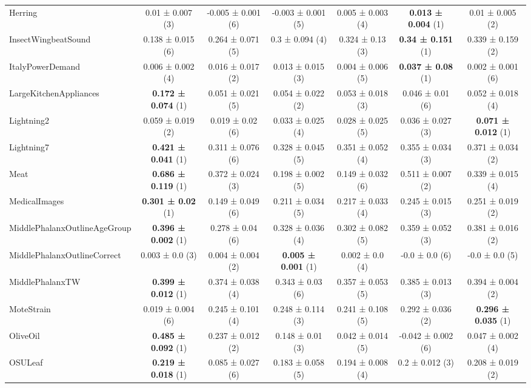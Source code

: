 \begin{table}[ht]
\begin{adjustbox}{width=\textwidth}
\begin{tabular}{lcccccc}
    Herring & 0.01 ± 0.007 (3) & -0.005 ± 0.001 (6) & -0.003 ± 0.001 (5) & 0.005 ± 0.003 (4) & \textbf{0.013 ± 0.004} (1) & 0.01 ± 0.005 (2) \\
    InsectWingbeatSound & 0.138 ± 0.015 (6) & 0.264 ± 0.071 (5) & 0.3 ± 0.094 (4) & 0.324 ± 0.13 (3) & \textbf{0.34 ± 0.151} (1) & 0.339 ± 0.159 (2) \\
    ItalyPowerDemand & 0.006 ± 0.002 (4) & 0.016 ± 0.017 (2) & 0.013 ± 0.015 (3) & 0.004 ± 0.006 (5) & \textbf{0.037 ± 0.08} (1) & 0.002 ± 0.001 (6) \\
    LargeKitchenAppliances & \textbf{0.172 ± 0.074} (1) & 0.051 ± 0.021 (5) & 0.054 ± 0.022 (2) & 0.053 ± 0.018 (3) & 0.046 ± 0.01 (6) & 0.052 ± 0.018 (4) \\
    Lightning2 & 0.059 ± 0.019 (2) & 0.019 ± 0.02 (6) & 0.033 ± 0.025 (4) & 0.028 ± 0.025 (5) & 0.036 ± 0.027 (3) & \textbf{0.071 ± 0.012} (1) \\
    Lightning7 & \textbf{0.421 ± 0.041} (1) & 0.311 ± 0.076 (6) & 0.328 ± 0.045 (5) & 0.351 ± 0.052 (4) & 0.355 ± 0.034 (3) & 0.371 ± 0.034 (2) \\
    Meat & \textbf{0.686 ± 0.119} (1) & 0.372 ± 0.024 (3) & 0.198 ± 0.002 (5) & 0.149 ± 0.032 (6) & 0.511 ± 0.007 (2) & 0.339 ± 0.015 (4) \\
    MedicalImages & \textbf{0.301 ± 0.02} (1) & 0.149 ± 0.049 (6) & 0.211 ± 0.034 (5) & 0.217 ± 0.033 (4) & 0.245 ± 0.015 (3) & 0.251 ± 0.019 (2) \\
    MiddlePhalanxOutlineAgeGroup & \textbf{0.396 ± 0.002} (1) & 0.278 ± 0.04 (6) & 0.328 ± 0.036 (4) & 0.302 ± 0.082 (5) & 0.359 ± 0.052 (3) & 0.381 ± 0.016 (2) \\
    MiddlePhalanxOutlineCorrect & 0.003 ± 0.0 (3) & 0.004 ± 0.004 (2) & \textbf{0.005 ± 0.001} (1) & 0.002 ± 0.0 (4) & -0.0 ± 0.0 (6) & -0.0 ± 0.0 (5) \\
    MiddlePhalanxTW & \textbf{0.399 ± 0.012} (1) & 0.374 ± 0.038 (4) & 0.343 ± 0.03 (6) & 0.357 ± 0.053 (5) & 0.385 ± 0.013 (3) & 0.394 ± 0.004 (2) \\
    MoteStrain & 0.019 ± 0.004 (6) & 0.245 ± 0.101 (4) & 0.248 ± 0.114 (3) & 0.241 ± 0.108 (5) & 0.292 ± 0.036 (2) & \textbf{0.296 ± 0.035} (1) \\
    OliveOil & \textbf{0.485 ± 0.092} (1) & 0.237 ± 0.012 (2) & 0.148 ± 0.01 (3) & 0.042 ± 0.014 (5) & -0.042 ± 0.002 (6) & 0.047 ± 0.002 (4) \\
    OSULeaf & \textbf{0.219 ± 0.018} (1) & 0.085 ± 0.027 (6) & 0.183 ± 0.058 (5) & 0.194 ± 0.008 (4) & 0.2 ± 0.012 (3) & 0.208 ± 0.019 (2) \\

\end{tabular}
\end{adjustbox}
\end{table}
